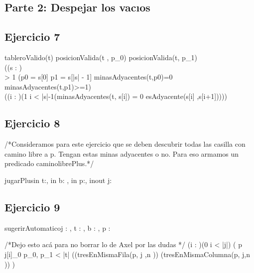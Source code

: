 \documentclass[a4paper]{article}
\begin{document}
\subsection*{Parte 2: Despejar los vacıos}

\subsection*{Ejercicio 7}


{ tableroValido(t) \y posicionValida(t , p_{0}) \y posicionValida(t, p_{1})\y \\
((\exists s : \TLista{\pos}) \\
 > 1 \yLuego (p0 = s[0] \y p1 = s[|s| - 1] \y minasAdyacentes(t,p0)=0 \y minasAdyacentes(t,p1)>=1) \y \\
((\forall i : \ent)(1 \leq i < |s|-1\implicaLuego (minasAdyacentes(t, s[i]) = 0 \y esAdyacente(s[i] ,s[i+1]))))}

\subsection*{Ejercicio 8}

/*Consideramos para este ejercicio que se deben descubrir todas las casilla con camino libre a p. Tengan estas minas adyacentes o no. Para eso armamos un predicado caminolibrePlus.*/

\begin{proc}{jugarPlus}{in t:\tablero, in b: \banderitas, in p:\pos, inout j: \jugadas}{}

\end{proc}

\subsection*{Ejercicio 9}
\begin{proc}{sugerirAutomatico}{\In j : \jugadas, \In t : \tablero , \In b : \banderitas, \Out p : \pos}{}
\end{proc}

/*Dejo esto acá para no borrar lo de Axel por las dudas */
(\forall i : \ent)(0 \leq i < |j|) \implicaLuego( p \neq j[i]_{0}  \leq p_{0}, p_{1} < |t| \y ((tresEnMismaFila(p, j ,n ))  \vee  (tresEnMismaColumna(p, j,n )) )
\end{document}

